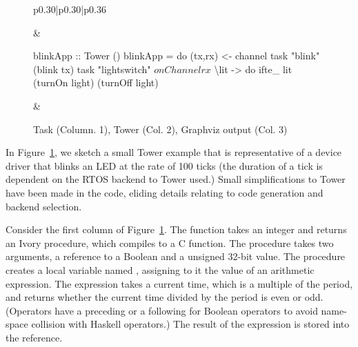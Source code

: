 \begin{figure}[h!t]
  \begin{tabular}{p{}|p{}|p{}}
&
    \begin{smcode}
blinkApp :: Tower ()
blinkApp = do
  (tx,rx) <- channel
  task "blink" (blink tx)
  task "lightswitch" $
    onChannel rx $
      \textbackslash{}lit -> do
        ifte_ lit (turnOn light)
                  (turnOff light)
    \end{smcode}
&
  \end{tabular}
  \caption{Task (Column. 1), Tower (Col. 2), Graphviz output (Col. 3)}
  \label{fig:tower-ex}
\end{figure}

In Figure~\ref{fig:tower-ex}, we sketch a small Tower example that is
representative of a device driver that blinks an LED at the rate of 100 ticks
(the duration of a tick is dependent on the RTOS backend to Tower used.)  Small
simplifications to Tower have been made in the code, eliding details relating to
code generation and backend selection.

Consider the first column of Figure~\ref{fig:tower-ex}.  The function takes an
integer and returns an Ivory procedure, which compiles to a C function.  The
procedure takes two arguments, a reference to a Boolean and a unsigned 32-bit
value.  The procedure creates a local variable named ,
assigning to it the value of an arithmetic expression.  The expression
takes a current time, which is a multiple of the period, and returns whether the
current time divided by the period is even or odd.  (Operators have a preceding
 or a following  for Boolean operators to avoid name-space collision
with Haskell operators.)  The result of the expression is stored into the
 reference.

